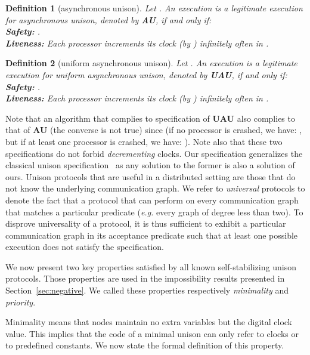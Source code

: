 \documentclass[11pt,english,letterpaper]{article}
\newtheorem{definition}{Definition}
\begin{document}
\begin{definition}[asynchronous unison]
Let . An execution  is a legitimate execution for asynchronous unison, denoted by \textbf{AU}, if and only if:\\
\indent \textbf{Safety:} .\\
\indent \textbf{Liveness:} Each processor  increments its clock (by ) infinitely often in .
\end{definition}
	
\begin{definition}[uniform asynchronous unison]
Let . An execution  is a legitimate execution for uniform asynchronous unison, denoted by \textbf{UAU}, if and only if:\\
\indent \textbf{Safety:} .\\
\indent \textbf{Liveness:} Each processor  increments its clock (by ) infinitely often in .
\end{definition}

Note that an algorithm that complies to specification of \textbf{UAU} also complies to that of \textbf{AU} (the converse is not true) since  (if no processor is crashed, we have: , but if at least one processor is crashed, we have: ). Note also that these two specifications do not forbid \emph{decrementing} clocks. Our specification generalizes the classical unison specification~\cite{CFG92c} as any solution to the former is also a solution of ours. Unison protocols that are useful in a distributed setting are those that do not know the underlying communication graph. We refer to \emph{universal} protocols to denote the fact that a protocol that can perform on every communication graph that matches a particular predicate (\emph{e.g.} every graph of degree less than two). To disprove universality of a protocol, it is thus sufficient to exhibit a particular communication graph in its acceptance predicate such that at least one possible execution does not satisfy the specification.

We now present two key properties satisfied by all known self-stabilizing unison protocols. Those properties are used in the impossibility results presented in Section~\ref{sec:negative}. We called these properties respectively \emph{minimality} and \emph{priority}.

Minimality means that nodes maintain no extra variables but the digital clock value. This implies that the code of a minimal unison can only refer to clocks or to predefined constants. We now state the formal definition of this property.
\end{document}

